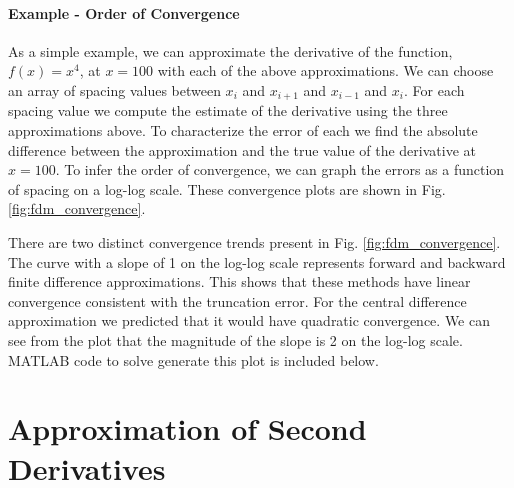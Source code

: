 \paragraph{Example - Order of Convergence}
As a simple example, we can approximate the derivative of the function, $f\left(x\right) = x^{4}$, at $x=100$ with
each of the above approximations. We can choose an array of spacing values between $x_{i}$ and $x_{i+1}$ and $x_{i-1}$
and $x_{i}$. For each spacing value we compute the estimate of the derivative using the three approximations above.
To characterize the error of each we find the absolute difference between the approximation and the true value of the
derivative at $x=100$. To infer the order of convergence, we can graph the errors as a function of spacing on a 
log-log scale. These convergence plots are shown in Fig. \ref{fig:fdm_convergence}.
\par 
There are two distinct convergence trends present in Fig. \ref{fig:fdm_convergence}.  The curve with a slope of 1 on
the log-log scale represents forward and backward finite difference approximations. This shows that these methods
have linear convergence consistent with the truncation error. For the central difference approximation we predicted
that it would have quadratic convergence. We can see from the plot that the magnitude of the slope is 2 on the log-log scale.
MATLAB code to solve generate this plot is included below.


\section{Approximation of Second Derivatives}

